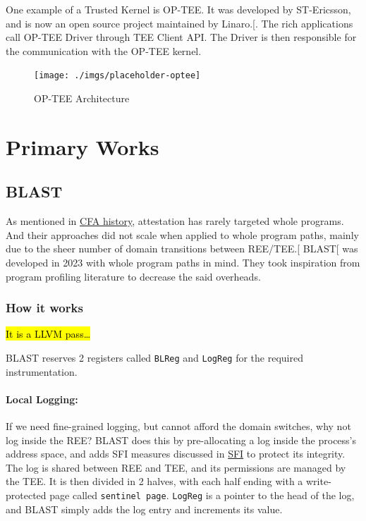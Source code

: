 \documentclass[a4paper, nobind]{templates/ociamthesis}
\begin{document}
One example of a Trusted Kernel is OP-TEE. It was developed by ST-Ericsson,
and is now an open source project maintained by Linaro.{[}\citeproc{ref-optee}{8}{]}.
The rich applications call OP-TEE Driver through TEE Client API. The Driver
is then responsible for the communication with the OP-TEE kernel.

\begin{figure}[H]

{\centering \texttt{[image: ./imgs/placeholder-optee]} 

}

\caption{OP-TEE Architecture}\label{fig:optee-arch}
\end{figure}

\section{Primary Works}\label{primary-works}

\subsection{BLAST}\label{blast}

As mentioned in \hyperref[cfahistory]{CFA history}, attestation has rarely targeted whole programs.
And their approaches did not scale when applied to whole program paths, mainly
due to the sheer number of domain transitions between REE/TEE.{[}\citeproc{ref-blast}{14}{]}
BLAST{[}\citeproc{ref-blast}{14}{]} was developed in 2023 with whole program paths in mind.
They took inspiration from program profiling literature to decrease the said overheads.

\subsubsection{How it works}\label{how-it-works}

\hl{It is a LLVM pass\ldots{}}

BLAST reserves 2 registers called \texttt{BLReg} and \texttt{LogReg} for the required instrumentation.

\paragraph{Local Logging:}\label{local-logging}

If we need fine-grained logging, but cannot afford the domain switches, why not log inside the REE?
BLAST does this by pre-allocating a log inside the process's address space,
and adds SFI measures discussed in \hyperref[blastsfi]{SFI} to protect its integrity.
The log is shared between REE and TEE, and its permissions are managed by the TEE.
It is then divided in 2 halves, with each half ending with a write-protected page called \texttt{sentinel\ page}.
\texttt{LogReg} is a pointer to the head of the log, and BLAST simply adds the log entry
and increments its value.
\end{document}
